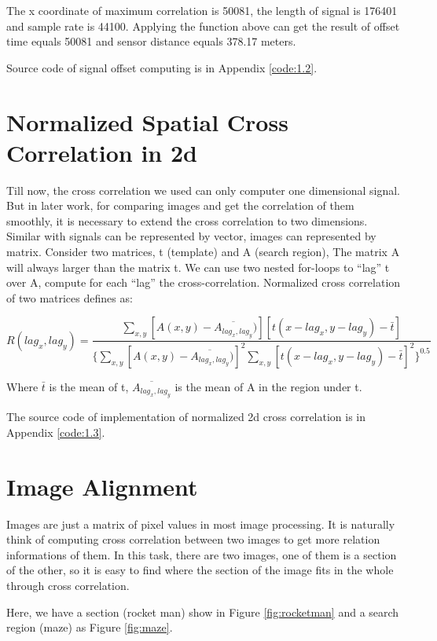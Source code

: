 The x coordinate of maximum correlation is 50081, the length of signal is 176401 and sample rate is 44100. Applying the function above can get the result of offset time equals 50081 and sensor distance equals 378.17 meters.

Source code of signal offset computing is in Appendix \ref{code:1.2}.

\section{Normalized Spatial Cross Correlation in 2d}

Till now, the cross correlation we used can only computer one dimensional signal. But in later work, for comparing images and get the correlation of them smoothly, it is necessary to extend the cross correlation to two dimensions. Similar with signals can be represented by vector, images can represented by matrix. Consider two matrices, t (template) and A (search region), The matrix A will always larger than the matrix t. We can use two nested for-loops to ``lag'' t over A, compute for each ``lag'' the cross-correlation. Normalized cross correlation of two matrices defines as:

\begin{equation*}
R(lag_{x},lag_{y})=
\frac{\sum_{x,y}[A(x,y)-\overline{A_{lag_{x},lag_{y}}})][t(x-lag_{x},y-lag_{y})-\bar{t}]}
{\{\sum_{x,y}[A(x,y)-\overline{A_{lag_{x},lag_{y}}})]^2
	\sum_{x,y}[t(x-lag_{x},y-lag_{y})-\bar{t}]^2
	\}^{0.5}}
\end{equation*}

Where $\bar{t}$ is the mean of t, $\overline{A_{lag_{x},lag_{y}}}$ is the mean of A in the region under t. 

The source code of implementation of normalized 2d cross correlation is in Appendix \ref{code:1.3}.

\section{Image Alignment}

Images are just a matrix of pixel values in most image processing. It is naturally think of computing cross correlation between two images to get more relation informations of them. In this task, there are two images, one of them is a section of the other, so it is easy to find where the section of the image fits in the whole through cross correlation.

Here, we have a section (rocket man) show in Figure \ref{fig:rocketman} and a search region (maze) as Figure \ref{fig:maze}.

